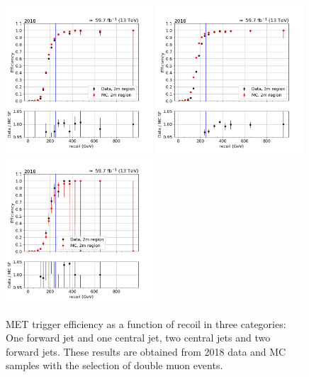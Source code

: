 \begin{figure}[hbp]
    \begin{center}
        \includegraphics[width=0.49\textwidth]{fig/efficiency/trigger/met/recoil/data_mc_comparison_2m_2018_one_jet_forward_one_jet_central.png}
        \includegraphics[width=0.49\textwidth]{fig/efficiency/trigger/met/recoil/data_mc_comparison_2m_2018_two_central_jets.png} \\
        \includegraphics[width=0.49\textwidth]{fig/efficiency/trigger/met/recoil/data_mc_comparison_2m_2018_two_forward_jets.png}
    \end{center}
    \caption{MET trigger efficiency as a function of recoil in three categories: One forward jet and one central jet, two central jets and
            two forward jets. These results are obtained from 2018 data and MC samples with the selection of double muon events.}  
    \label{fig:eff_recoil_2018_2m}
\end{figure}